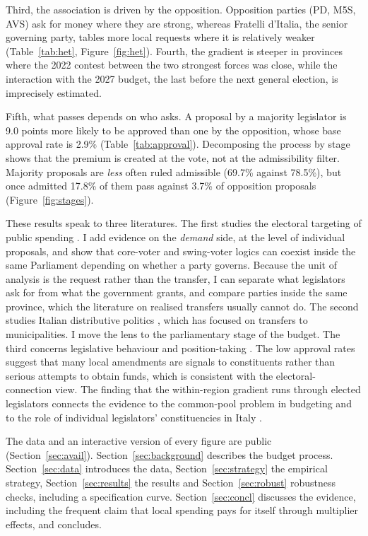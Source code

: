 \documentclass[12pt]{article}
\begin{document}
Third, the association is driven by the opposition. Opposition parties (PD, M5S, AVS) ask for money where they are strong, whereas Fratelli d'Italia, the senior governing party, tables more local requests where it is relatively weaker (Table~\ref{tab:het}, Figure~\ref{fig:het}). Fourth, the gradient is steeper in provinces where the 2022 contest between the two strongest forces was close, while the interaction with the 2027 budget, the last before the next general election, is imprecisely estimated.

Fifth, what passes depends on who asks. A proposal by a majority legislator is 9.0 points more likely to be approved than one by the opposition, whose base approval rate is 2.9\% (Table~\ref{tab:approval}). Decomposing the process by stage shows that the premium is created at the vote, not at the admissibility filter. Majority proposals are \emph{less} often ruled admissible (69.7\% against 78.5\%), but once admitted 17.8\% of them pass against 3.7\% of opposition proposals (Figure~\ref{fig:stages}).

These results speak to three literatures. The first studies the electoral targeting of public spending \citep{cox1986,dixit1996,levitt1997,ansolabehere2006,berry2010}. I add evidence on the \emph{demand} side, at the level of individual proposals, and show that core-voter and swing-voter logics can coexist inside the same Parliament depending on whether a party governs. Because the unit of analysis is the request rather than the transfer, I can separate what legislators ask for from what the government grants, and compare parties inside the same province, which the literature on realised transfers usually cannot do. The second studies Italian distributive politics \citep{golden2008,carozzi2016,bracco2015,brollo2012}, which has focused on transfers to municipalities. I move the lens to the parliamentary stage of the budget. The third concerns legislative behaviour and position-taking \citep{mayhew1974}. The low approval rates suggest that many local amendments are signals to constituents rather than serious attempts to obtain funds, which is consistent with the electoral-connection view. The finding that the within-region gradient runs through elected legislators connects the evidence to the common-pool problem in budgeting \citep{weingast1981,perssontabellini1999} and to the role of individual legislators' constituencies in Italy \citep{carozzi2016}.

The data and an interactive version of every figure are public (Section~\ref{sec:avail}). Section~\ref{sec:background} describes the budget process. Section~\ref{sec:data} introduces the data, Section~\ref{sec:strategy} the empirical strategy, Section~\ref{sec:results} the results and Section~\ref{sec:robust} robustness checks, including a specification curve. Section~\ref{sec:concl} discusses the evidence, including the frequent claim that local spending pays for itself through multiplier effects, and concludes.
\end{document}
